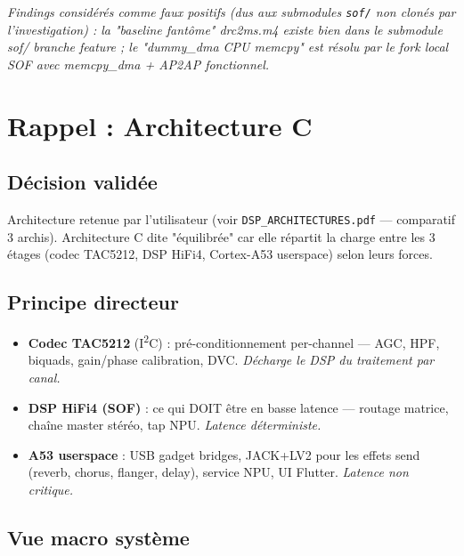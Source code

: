 \documentclass[11pt,a4paper]{article}
\begin{document}
\noindent\textit{Findings considérés comme faux positifs (dus aux submodules \texttt{sof/} non clonés par l'investigation) : la "baseline fantôme" drc2ms.m4 existe bien dans le submodule sof/ branche feature ; le "dummy\_dma CPU memcpy" est résolu par le fork local SOF avec memcpy\_dma + AP2AP fonctionnel.}

\clearpage

\section{Rappel : Architecture C}

\subsection{Décision validée}
Architecture retenue par l'utilisateur (voir \texttt{DSP\_ARCHITECTURES.pdf} --- comparatif 3 archis). Architecture C dite "équilibrée" car elle répartit la charge entre les 3 étages (codec TAC5212, DSP HiFi4, Cortex-A53 userspace) selon leurs forces.

\subsection{Principe directeur}
\begin{itemize}[leftmargin=*, itemsep=2pt]
  \item \textbf{Codec TAC5212} (I\textsuperscript{2}C) : pré-conditionnement per-channel --- AGC, HPF, biquads, gain/phase calibration, DVC. \textit{Décharge le DSP du traitement par canal.}
  \item \textbf{DSP HiFi4 (SOF)} : ce qui DOIT être en basse latence --- routage matrice, chaîne master stéréo, tap NPU. \textit{Latence déterministe.}
  \item \textbf{A53 userspace} : USB gadget bridges, JACK+LV2 pour les effets send (reverb, chorus, flanger, delay), service NPU, UI Flutter. \textit{Latence non critique.}
\end{itemize}

\subsection{Vue macro système}
\end{document}
